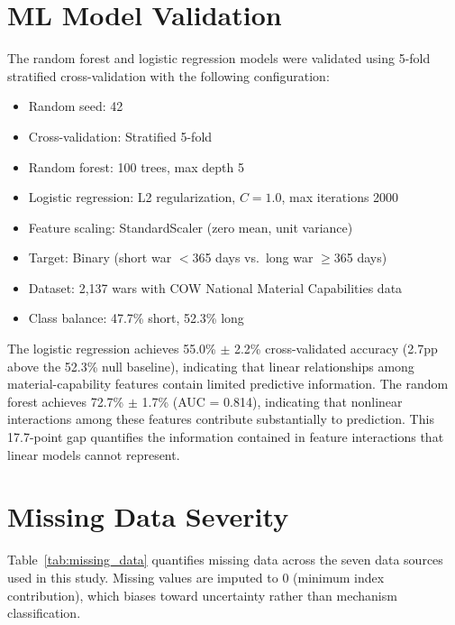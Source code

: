 \section{ML Model Validation}
\label{app:ml_validation}

The random forest and logistic regression models were validated using 5-fold stratified cross-validation with the following configuration:
\begin{itemize}
    \item Random seed: 42
    \item Cross-validation: Stratified 5-fold
    \item Random forest: 100 trees, max depth 5
    \item Logistic regression: L2 regularization, $C=1.0$, max iterations 2000
    \item Feature scaling: StandardScaler (zero mean, unit variance)
    \item Target: Binary (short war $<$365 days vs.\ long war $\geq$365 days)
    \item Dataset: 2,137 wars with COW National Material Capabilities data
    \item Class balance: 47.7\% short, 52.3\% long
\end{itemize}

The logistic regression achieves 55.0\% $\pm$ 2.2\% cross-validated accuracy (2.7pp above the 52.3\% null baseline), indicating that linear relationships among material-capability features contain limited predictive information. The random forest achieves 72.7\% $\pm$ 1.7\% (AUC = 0.814), indicating that nonlinear interactions among these features contribute substantially to prediction. This 17.7-point gap quantifies the information contained in feature interactions that linear models cannot represent.

\section{Missing Data Severity}
\label{app:missing_data}

Table~\ref{tab:missing_data} quantifies missing data across the seven data sources used in this study. Missing values are imputed to 0 (minimum index contribution), which biases toward uncertainty rather than mechanism classification.

